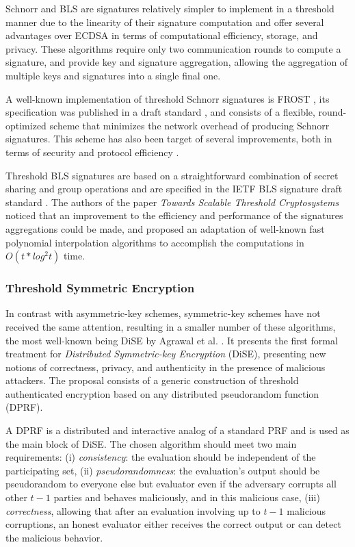 \documentclass[runningheads]{llncs}
\begin{document}
Schnorr \cite{schnorrnotes} and BLS \cite{blsdraft} are signatures relatively simpler to implement in a threshold manner due to the linearity of their signature computation and offer several advantages over ECDSA in terms of computational efficiency, storage, and privacy. These algorithms require only two communication rounds to compute a signature, and provide key and signature aggregation, allowing the aggregation of multiple keys and signatures into a single final one.

A well-known implementation of threshold Schnorr signatures is FROST \cite{frost}, its specification was published in a draft standard \cite{frostdraft}, and consists of a flexible, round-optimized scheme that minimizes the network overhead of producing Schnorr signatures. This scheme has also been target of several improvements, both in terms of security and protocol efficiency \cite{frost3,frost3plus}.

Threshold BLS signatures are based on a straightforward combination of secret sharing and group operations and are specified in the IETF BLS signature draft standard \cite{blsdraft}. The authors of the paper \textit{Towards Scalable Threshold Cryptosystems} \cite{blsimproved} noticed that an improvement to the efficiency and performance of the signatures aggregations could be made, and proposed an adaptation of well-known fast polynomial interpolation algorithms to accomplish the computations in $O(t*log^2t)$ time.


\subsubsection{Threshold Symmetric Encryption} \label{subsec:threshencrypt}
In contrast with asymmetric-key schemes, symmetric-key schemes have not received the same attention, resulting in a smaller number of these algorithms, the most well-known being DiSE by Agrawal et al. \cite{dise}. It presents the first formal treatment for \textit{Distributed Symmetric-key Encryption} (DiSE), presenting new notions of correctness, privacy, and authenticity in the presence of malicious attackers. The proposal consists of a generic construction of threshold authenticated encryption based on any distributed pseudorandom function (DPRF).

A DPRF is a distributed and interactive analog of a standard PRF and is used as the main block of DiSE. The chosen algorithm should meet two main requirements: (i) \textit{consistency}: the evaluation should be independent of the participating set, (ii) \textit{pseudorandomness}: the evaluation's output should be pseudorandom to everyone else but evaluator even if the adversary corrupts all other $t - 1$ parties and behaves maliciously, and in this malicious case, (iii) \textit{correctness}, allowing that after an evaluation involving up to $t - 1$ malicious corruptions, an honest evaluator either receives the correct output or can detect the malicious behavior.
\end{document}
